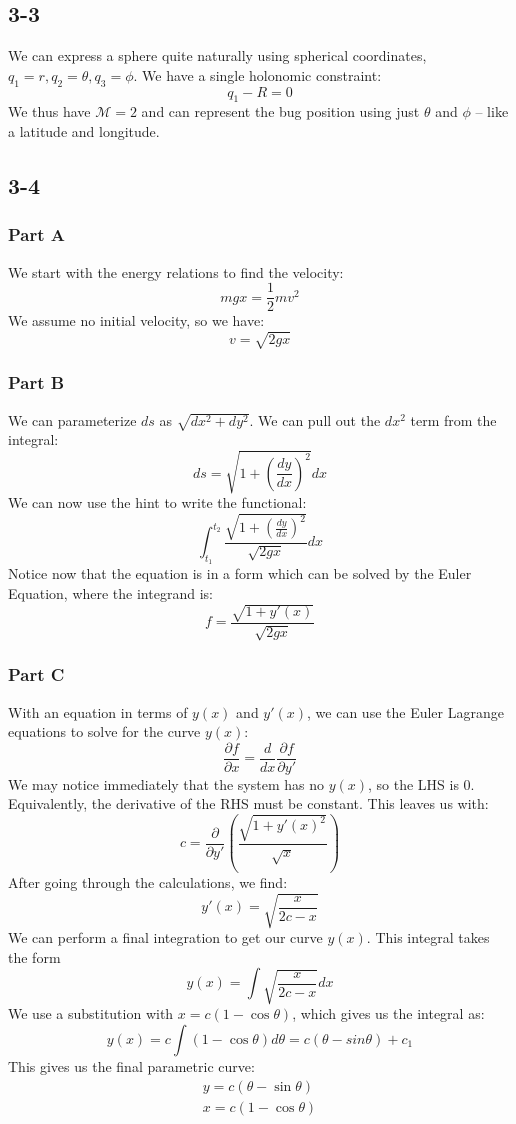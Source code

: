 \subsection*{3-3}
We can express a sphere quite naturally using spherical coordinates, $q_1=r,q_2=\theta,q_3=\phi$. We have a single holonomic constraint:
$$q_1-R=0$$
We thus have $\mathcal{M}=2$ and can represent the bug position using just $\theta$ and $\phi$ -- like a latitude and longitude.
\subsection*{3-4}
\subsubsection{Part A}
We start with the energy relations to find the velocity:
$$mgx=\frac{1}{2}mv^2$$
We assume no initial velocity, so we have:
$$v=\sqrt{2gx}$$
\subsubsection{Part B}
We can parameterize $ds$ as $\sqrt{dx^2+dy^2}$. We can pull out the $dx^2$ term from the integral:
$$ds=\sqrt{1+\left(\frac{dy}{dx}\right)^2}dx$$
We can now use the hint to write the functional:
$$\int_{t_1}^{t_2}\frac{\sqrt{1+\left(\frac{dy}{dx}\right)^2}}{\sqrt{2gx}}dx$$
Notice now that the equation is in a form which can be solved by the \gls{Euler Equation}, where the integrand is:
$$f=\frac{\sqrt{1+y'(x)}}{\sqrt{2gx}}$$
\subsubsection{Part C}
With an equation in terms of $y(x)$ and $y'(x)$, we can use the Euler Lagrange equations to solve for the curve $y(x)$:
    $$\frac{\partial f}{\partial x}=\frac{d}{dx}\frac{\partial f}{\partial y'}$$
    We may notice immediately that the system has no $y(x)$, so the LHS is 0. Equivalently, the derivative of the RHS must be constant. This leaves us with:$$c=\frac{\partial}{\partial y'}\left(\frac{\sqrt{1+y'(x)^2}}{\sqrt{x}}\right)$$
    After going through the calculations, we find:$$y'(x)=\sqrt{\frac{x}{2c-x}}$$
    We can perform a final integration to get our curve $y(x)$. This integral takes the form $$y(x)=\int\sqrt{\frac{x}{2c-x}}dx$$
We use a substitution with $x=c(1-\cos\theta)$, which gives us the integral as:
    $$y(x)=c\int(1-\cos\theta)d\theta=c(\theta-sin\theta)+c_1$$ This gives us the final parametric curve:
    \begin{gather}
        y=c(\theta-\sin\theta)\\
        x=c(1-\cos\theta)
    \end{gather}
